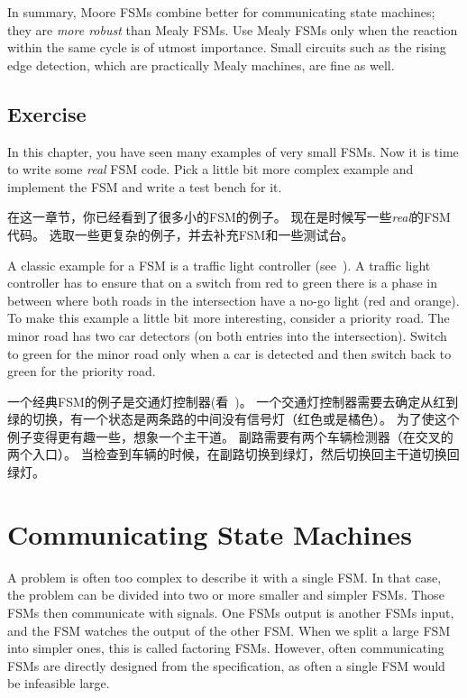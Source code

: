 \documentclass[%
    10pt,
    headinclude, footexclude,
    openright, %
    notitlepage,
    cleardoubleempty,
    headsepline,
    pointlessnumbers,
    bibtotoc, idxtotoc,
    ]{scrbook}
\newcommand{\todo}[1]{{\emph{TODO: #1}}}
\renewcommand{\todo}[1]{}
\begin{document}
{In summary, Moore FSMs combine better for communicating state machines; they
are \emph{more robust} than Mealy FSMs. Use Mealy FSMs only when the reaction within the same
cycle is of utmost importance. Small circuits such as the rising edge detection,
which are practically Mealy machines, are fine as well.

\section{Exercise}

In this chapter, you have seen many examples of very small FSMs.
Now it is time to write some \emph{real} FSM code.
Pick a little bit more complex example and implement the FSM and
write a test bench for it.

在这一章节，你已经看到了很多小的FSM的例子。
现在是时候写一些\emph{real}的FSM代码。
选取一些更复杂的例子，并去补充FSM和一些测试台。

A classic example for a FSM is a traffic light controller (see~\cite[Section~14.3]{dally:vhdl:2016}).
A traffic light controller has to ensure that on a switch from red to green
there is a phase in between where both roads in the intersection
have a no-go light (red and orange).
To make this example a little bit more interesting, consider a priority road.
The minor road has two car detectors (on both entries into the intersection).
Switch to green for the minor road only when a car is detected and then switch
back to green for the priority road.

一个经典FSM的例子是交通灯控制器(看~\cite[Section~14.3]{dally:vhdl:2016})。
一个交通灯控制器需要去确定从红到绿的切换，有一个状态是两条路的中间没有信号灯（红色或是橘色）。
为了使这个例子变得更有趣一些，想象一个主干道。
副路需要有两个车辆检测器（在交叉的两个入口）。
当检查到车辆的时候，在副路切换到绿灯，然后切换回主干道切换回绿灯。

\todo{Luca: Greatest common divisor with Euclide algorithm can be also a nice exercise.
Martin: but this is shown at the Chisel homepage without an FSM.}

\chapter{Communicating State Machines}

A problem is often too complex to describe it with a single FSM.
In that case, the problem can be divided into two or more smaller and simpler FSMs.
Those FSMs then communicate with signals. One FSMs output is
another FSMs input, and the FSM watches the output of the other FSM.
When we split a large FSM into simpler ones, this is called factoring FSMs.
However, often communicating FSMs are directly designed from the specification,
as often a single FSM would be infeasible large.

}
\end{document}
